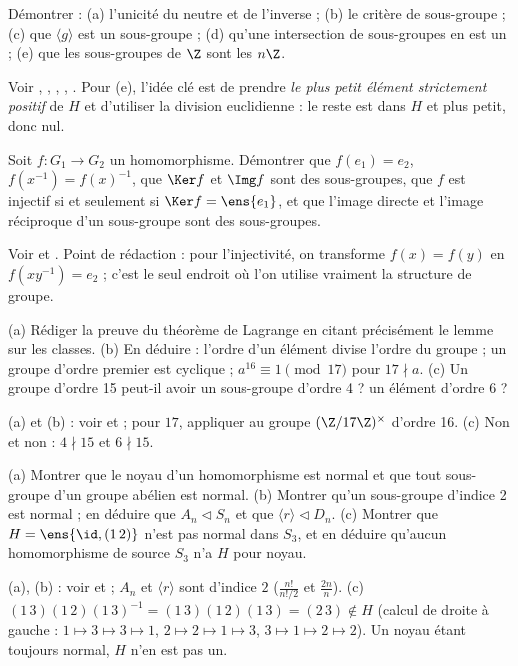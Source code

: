 \begin{exo}
Démontrer : (a) l'unicité du neutre et de l'inverse ; (b) le critère de sous-groupe ; (c) que $\langle g\rangle$ est un sous-groupe ; (d) qu'une intersection de sous-groupes en est un ; (e) que les sous-groupes de $\Z$ sont les $n\Z$.
\begin{corrige}
Voir , , , , . Pour (e), l'idée clé est de prendre \emph{le plus petit élément strictement positif} de $H$ et d'utiliser la division euclidienne : le reste est dans $H$ et plus petit, donc nul.
\end{corrige}
\end{exo}
\begin{exo}[S][Homomorphismes]
Soit $f:G_1\to G_2$ un homomorphisme. Démontrer que $f(e_1)=e_2$, $f(x^{-1})=f(x)^{-1}$, que $\Ker f$ et $\Img f$ sont des sous-groupes, que $f$ est injectif si et seulement si $\Ker f=\ens{e_1}$, et que l'image directe et l'image réciproque d'un sous-groupe sont des sous-groupes.
\begin{corrige}
Voir  et . Point de rédaction : pour l'injectivité, on transforme $f(x)=f(y)$ en $f(xy^{-1})=e_2$ ; c'est le seul endroit où l'on utilise vraiment la structure de groupe.
\end{corrige}
\end{exo}
\begin{exo}
(a) Rédiger la preuve du théorème de Lagrange en citant précisément le lemme sur les classes. (b) En déduire : l'ordre d'un élément divise l'ordre du groupe ; un groupe d'ordre premier est cyclique ; $a^{16}\equiv1\pmod{17}$ pour $17\nmid a$. (c) Un groupe d'ordre 15 peut-il avoir un sous-groupe d'ordre 4 ? un élément d'ordre 6 ?
\begin{corrige}
(a) et (b) : voir  et  ; pour $17$, appliquer au groupe $(\Z/17\Z)^\times$ d'ordre 16. (c) Non et non : $4\nmid15$ et $6\nmid15$.
\end{corrige}
\end{exo}
\begin{exo}
(a) Montrer que le noyau d'un homomorphisme est normal et que tout sous-groupe d'un groupe abélien est normal. (b) Montrer qu'un sous-groupe d'indice 2 est normal ; en déduire que $A_n\lhd S_n$ et que $\langle r\rangle\lhd D_n$. (c) Montrer que $H=\ens{\id,(1\,2)}$ n'est pas normal dans $S_3$, et en déduire qu'aucun homomorphisme de source $S_3$ n'a $H$ pour noyau.
\begin{corrige}
(a), (b) : voir  et  ; $A_n$ et $\langle r\rangle$ sont d'indice $2$ ($\frac{n!}{n!/2}$ et $\frac{2n}n$). (c) $(1\,3)(1\,2)(1\,3)^{-1}=(1\,3)(1\,2)(1\,3)=(2\,3)\notin H$ (calcul de droite à gauche : $1\mapsto3\mapsto3\mapsto1$, $2\mapsto2\mapsto1\mapsto3$, $3\mapsto1\mapsto2\mapsto2$). Un noyau étant toujours normal, $H$ n'en est pas un.
\end{corrige}
\end{exo}
